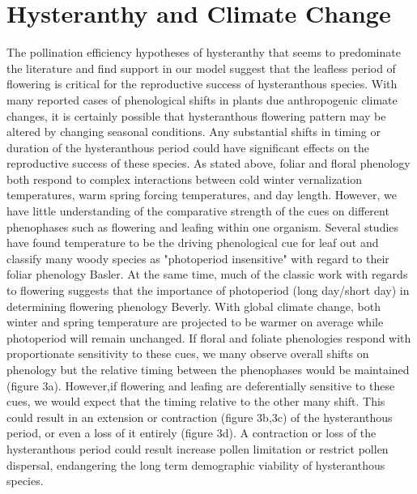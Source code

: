 \documentclass{article}\usepackage[]{graphicx}\usepackage[]{color}
\begin{document}
\section*{Hysteranthy and Climate Change}
\indent The pollination efficiency hypotheses of hysteranthy that seems to predominate the literature and find support in our model suggest that the leafless period of flowering is critical for the reproductive success of hysteranthous species. With many reported cases of phenological shifts in plants due anthropogenic climate changes, it is certainly possible that hysteranthous flowering pattern may be altered by changing seasonal conditions. Any substantial shifts in timing or duration of the hysteranthous period could have significant effects on the reproductive success of these species. As stated above, foliar and floral phenology both respond to complex interactions between cold winter vernalization temperatures, warm spring forcing temperatures, and day length. However, we have little understanding of the comparative strength of the cues on different phenophases such as flowering and leafing within one organism. Several studies have found temperature to be the driving phenological cue for leaf out and classify many woody species as "photoperiod insensitive" with regard to their foliar phenology {Basler}. At the same time, much of the classic work with regards to flowering suggests that the importance of photoperiod (long day/short day) in determining flowering phenology {Beverly}. With global climate change, both winter and spring temperature are projected to be warmer on average while photoperiod will remain unchanged. If floral and foliate phenologies respond with proportionate sensitivity to these cues, we many observe overall shifts on phenology but the relative timing between the phenophases would be maintained (figure 3a). However,if flowering and leafing are deferentially sensitive to these cues, we would expect that the timing relative to the other many shift. This could result in an extension or contraction (figure 3b,3c) of the hysteranthous period, or even a loss of it entirely (figure 3d). A contraction or loss of the hysteranthous period could result increase pollen limitation or restrict pollen dispersal, endangering the long term  demographic viability of hysteranthous species.\\
\end{document}
